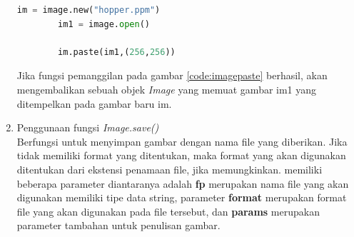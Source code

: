 \begin{enumerate}
\begin{lstlisting}[language=Python, caption=Pemanggilan fungsi \textit{paste()},label={code:imagepaste}]
		im = image.new("hopper.ppm")
		im1 = image.open()
		
		im.paste(im1,(256,256))
	\end{lstlisting}
	Jika fungsi pemanggilan pada gambar \ref{code:imagepaste} berhasil, akan mengembalikan sebuah objek \textit{Image} yang memuat gambar im1 yang ditempelkan pada gambar baru im.
	\item Penggunaan fungsi \textit{Image.save()}\\
	Berfungsi untuk menyimpan gambar dengan nama file yang diberikan. Jika tidak memiliki format yang ditentukan, maka format yang akan digunakan ditentukan dari ekstensi penamaan file, jika memungkinkan. memiliki beberapa parameter diantaranya adalah \textbf{fp} merupakan nama file yang akan digunakan memiliki tipe data string, parameter \textbf{format} merupakan format file yang akan digunakan pada file tersebut, dan \textbf{params} merupakan parameter tambahan untuk penulisan gambar.
\end{enumerate}





